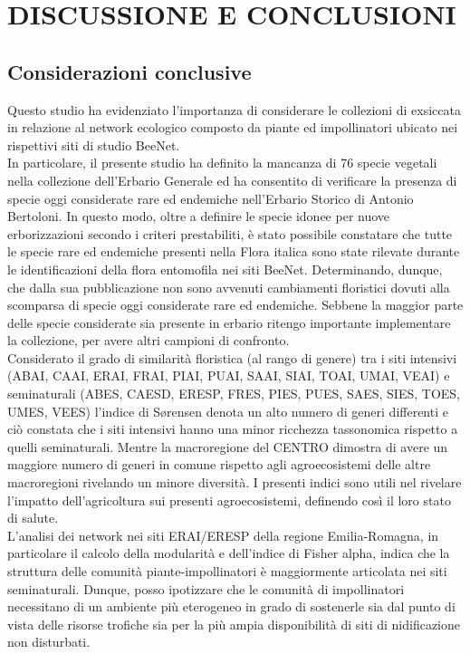 \documentclass[main.tex]{subfiles}
\begin{document}
\section{DISCUSSIONE E CONCLUSIONI}
\subsection{Considerazioni conclusive}

\textnormal{
Questo studio ha evidenziato l'importanza di considerare le collezioni di exsiccata in relazione al network ecologico composto da piante ed impollinatori ubicato nei rispettivi siti di studio BeeNet. \\
In particolare, il presente studio ha definito la mancanza di 76 specie vegetali nella collezione dell’Erbario Generale ed ha consentito di verificare la presenza di specie oggi considerate rare ed endemiche nell’Erbario Storico di Antonio Bertoloni. In questo modo, oltre a definire le specie idonee per nuove erborizzazioni secondo i criteri prestabiliti, è stato possibile constatare che tutte le specie rare ed endemiche presenti nella Flora italica sono state rilevate durante le identificazioni della flora entomofila nei siti BeeNet. Determinando, dunque, che dalla sua pubblicazione non sono avvenuti cambiamenti floristici \citep{aless} dovuti alla scomparsa di specie oggi considerate rare ed endemiche. Sebbene la maggior parte delle specie considerate sia presente in erbario ritengo importante implementare la collezione, per avere altri campioni di confronto. \\
Considerato il grado di similarità floristica (al rango di genere) tra i siti intensivi (ABAI, CAAI, ERAI, FRAI, PIAI, PUAI, SAAI, SIAI, TOAI, UMAI, VEAI) e seminaturali (ABES, CAESD, ERESP, FRES, PIES, PUES, SAES, SIES, TOES, UMES, VEES) l’indice di Sørensen denota un alto numero di generi differenti e ciò constata che i siti intensivi hanno una minor ricchezza tassonomica rispetto a quelli seminaturali. Mentre la macroregione del CENTRO dimostra di avere un maggiore numero di generi in comune rispetto agli agroecosistemi delle altre macroregioni rivelando un minore diversità. I presenti indici sono utili nel rivelare l’impatto dell’agricoltura sui presenti agroecosistemi, definendo così il loro stato di salute. \\
L’analisi dei network nei siti ERAI/ERESP della regione Emilia-Romagna, in particolare il calcolo della modularità e dell’indice di Fisher alpha, indica che la struttura delle comunità piante-impollinatori è maggiormente articolata nei siti seminaturali. Dunque, posso ipotizzare che le comunità di impollinatori necessitano di un ambiente più eterogeneo in grado di sostenerle sia dal punto di vista delle risorse trofiche sia per la più ampia disponibilità di siti di nidificazione non disturbati. \\
}
\end{document}
